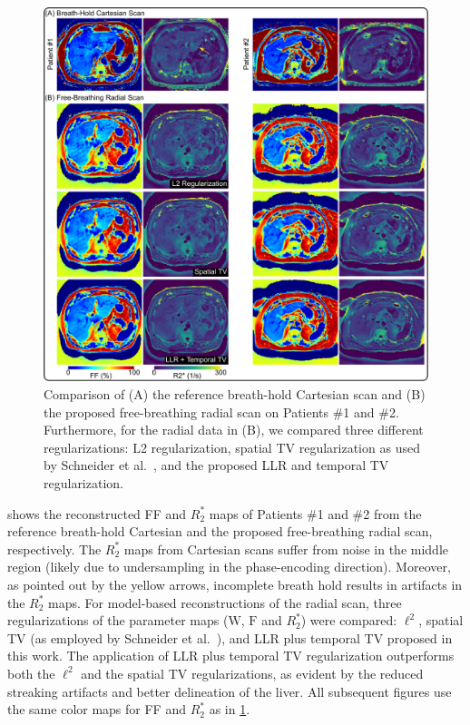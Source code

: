 \documentclass[journal,twoside,web]{ieeecolor}
\begin{document}
\begin{figure}
	\centering
	\includegraphics[width=\textwidth]{../../figures/tan5.pdf}
	\caption{Comparison of (A) the reference breath-hold Cartesian scan and 
		(B) the proposed free-breathing radial scan on Patients \#1 and \#2. 
		Furthermore, for the radial data in (B), 
		we compared three different regularizations: 
		L2 regularization, 
		spatial TV regularization as used by Schneider et al.~\cite{schneider_2020_mobawfr2s}, 
		and the proposed LLR and temporal TV regularization. }
	\label{FIG:REGU}
\end{figure}

 shows the reconstructed FF and $R_2^*$ maps of Patients \#1 and \#2
from the reference breath-hold Cartesian and the proposed free-breathing radial scan, 
respectively. 
The $R_2^*$ maps from Cartesian scans suffer from noise in the middle region 
(likely due to undersampling in the phase-encoding direction). 
Moreover, as pointed out by the yellow arrows, 
incomplete breath hold results in artifacts in the $R_2^*$ maps.
For model-based reconstructions of the radial scan, 
three regularizations of the parameter maps ($\mathrm{W}$, $\mathrm{F}$ and $R_2^*$) were compared: 
$\ell^2$, spatial TV (as employed by Schneider et al.~\cite{schneider_2020_mobawfr2s}), and 
LLR plus temporal TV proposed in this work. 
The application of LLR plus temporal TV regularization outperforms 
both the $\ell^2$ and the spatial TV regularizations, 
as evident by the reduced streaking artifacts and better delineation of the liver. 
All subsequent figures use the same color maps for FF and $R_2^*$ as in \cref{FIG:REGU}.
\end{document}
